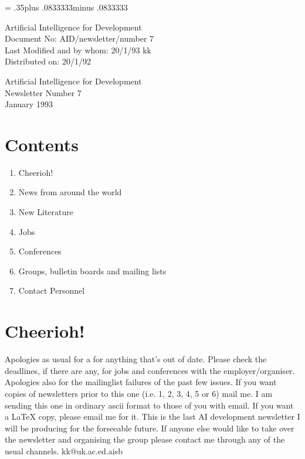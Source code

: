 \pagestyle{myheadings}
\setlength{\textheight}{9in}
\setlength{\topmargin}{0in}
\setlength{\headheight}{.3in}
\setlength{\headsep}{.5in}
\parindent=0pt
\parskip= .35\baselineskip plus .0833333\baselineskip minus .0833333\baselineskip

Artificial Intelligence for Development\\
Document No: AID/newsletter/number 7\\
Last Modified and by whom: 20/1/93 kk \\
Distributed on: 20/1/92\\
\LARGE
\begin{center} Artificial Intelligence for Development\\
Newsletter Number 7\\ January 1993\\

\end{center}
\normalsize
\section*{Contents}
\begin{enumerate}
\item Cheerioh!
\item News from around the world
\item New Literature
\item Jobs
\item Conferences
\item Groups, bulletin boards and mailing lists
\item Contact Personnel
\end{enumerate} 

\section{Cheerioh!}
Apologies as usual for a for anything that's out of date. Please check
the deadlines, if there are any, for jobs and conferences with the
employer/organiser. Apologies also for the mailinglist failures of the
past few issues. If you want copies of newsletters prior to this one
(i.e. 1, 2, 3, 4, 5 or 6) mail me. I am sending this one in ordinary
ascii format to those of you with email. If you want a LaTeX copy,
please email me for it. 
This is the last AI development newsletter I will 
be producing for the forseeable future. If anyone else would like to
take over the newsletter and organising the group please contact me
through any of the usual channels. kk@uk.ac.ed.aisb

